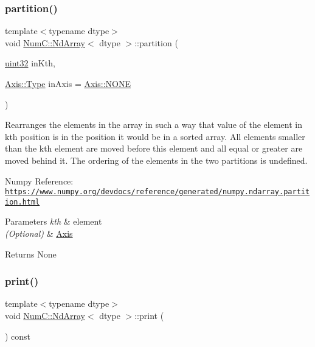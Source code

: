 \subsubsection{\texorpdfstring{partition()}{partition()}}
{\footnotesize\ttfamily template$<$typename dtype$>$ \\
void \mbox{\hyperlink{class_num_c_1_1_nd_array}{Num\+C\+::\+Nd\+Array}}$<$ dtype $>$\+::partition (\begin{DoxyParamCaption}\item[{\mbox{\hyperlink{namespace_num_c_ae685802ca6d3035f2b400b081e3953fa}{uint32}}}]{in\+Kth,  }\item[{\mbox{\hyperlink{struct_num_c_1_1_axis_a8e689044ef1941a03482e730c5e7ebb3}{Axis\+::\+Type}}}]{in\+Axis = {\ttfamily \mbox{\hyperlink{struct_num_c_1_1_axis_a8e689044ef1941a03482e730c5e7ebb3a0ae033c4226f7184bf0050b101e7ed94}{Axis\+::\+N\+O\+NE}}} }\end{DoxyParamCaption})\hspace{0.3cm}{\ttfamily [inline]}}

Rearranges the elements in the array in such a way that value of the element in kth position is in the position it would be in a sorted array. All elements smaller than the kth element are moved before this element and all equal or greater are moved behind it. The ordering of the elements in the two partitions is undefined.

Numpy Reference\+: \href{https://www.numpy.org/devdocs/reference/generated/numpy.ndarray.partition.html}{\tt https\+://www.\+numpy.\+org/devdocs/reference/generated/numpy.\+ndarray.\+partition.\+html}


\begin{DoxyParams}{Parameters}
{\em kth} & element \\
\hline
{\em (\+Optional)} & \mbox{\hyperlink{struct_num_c_1_1_axis}{Axis}} \\
\hline
\end{DoxyParams}
\begin{DoxyReturn}{Returns}
None 
\end{DoxyReturn}
\mbox{\label{class_num_c_1_1_nd_array_a4326a363b8f016fc72ba4ec22485f9de}} 
\subsubsection{\texorpdfstring{print()}{print()}}
{\footnotesize\ttfamily template$<$typename dtype$>$ \\
void \mbox{\hyperlink{class_num_c_1_1_nd_array}{Num\+C\+::\+Nd\+Array}}$<$ dtype $>$\+::print (\begin{DoxyParamCaption}{ }\end{DoxyParamCaption}) const\hspace{0.3cm}{\ttfamily [inline]}}

